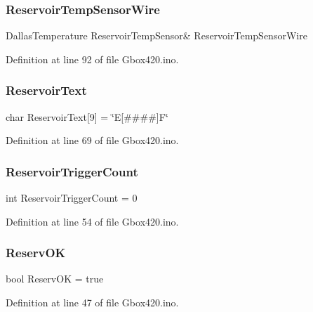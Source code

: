 \subsubsection{\texorpdfstring{ReservoirTempSensorWire}{ReservoirTempSensorWire}}
{\footnotesize\ttfamily Dallas\+Temperature Reservoir\+Temp\+Sensor\& Reservoir\+Temp\+Sensor\+Wire}



Definition at line 92 of file Gbox420.\+ino.

\mbox{\label{_gbox420_8ino_ad27e9c33dfa6d9cec818bb25429eecdc}} 
\subsubsection{\texorpdfstring{ReservoirText}{ReservoirText}}
{\footnotesize\ttfamily char Reservoir\+Text\mbox{[}9\mbox{]} = \char`\"{}E\mbox{[}\#\#\#\#\mbox{]}F\char`\"{}}



Definition at line 69 of file Gbox420.\+ino.

\mbox{\label{_gbox420_8ino_a30a8b4b425d796564807ff7fcc9d452e}} 
\subsubsection{\texorpdfstring{ReservoirTriggerCount}{ReservoirTriggerCount}}
{\footnotesize\ttfamily int Reservoir\+Trigger\+Count = 0}



Definition at line 54 of file Gbox420.\+ino.

\mbox{\label{_gbox420_8ino_a43e238bdd3f33a6308487be831374635}} 
\subsubsection{\texorpdfstring{ReservOK}{ReservOK}}
{\footnotesize\ttfamily bool Reserv\+OK = true}



Definition at line 47 of file Gbox420.\+ino.

